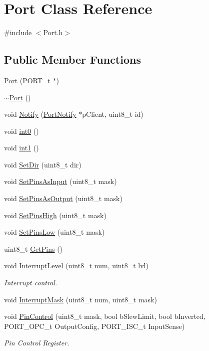 \hypertarget{class_port}{
\section{Port Class Reference}
\label{class_port}
}


{\ttfamily \#include $<$Port.h$>$}

\subsection*{Public Member Functions}
\begin{DoxyCompactItemize}
\item 
\hyperlink{class_port_a6f90240a1d5bb00b7cb0284134ba3dfc}{Port} (PORT\_\-t $\ast$)
\item 
\hyperlink{class_port_afe166c2a6b10ad34d47472a150366bc1}{$\sim$Port} ()
\item 
void \hyperlink{class_port_a8dd6215565362d65fd4ef159b7b8dc95}{Notify} (\hyperlink{class_port_notify}{PortNotify} $\ast$pClient, uint8\_\-t id)
\item 
void \hyperlink{class_port_ab9841b306c73a2b7a1a7a141da222808}{int0} ()
\item 
void \hyperlink{class_port_ac1ea39cc9b07779045dd218aa2364e25}{int1} ()
\item 
void \hyperlink{class_port_a3c3182388b13059550d19e828959ab37}{SetDir} (uint8\_\-t dir)
\item 
void \hyperlink{class_port_a8edf3efbf5258faa7221109f5cbd5a40}{SetPinsAsInput} (uint8\_\-t mask)
\item 
void \hyperlink{class_port_a15035cc63128ae28294c154527c9d2fe}{SetPinsAsOutput} (uint8\_\-t mask)
\item 
void \hyperlink{class_port_a4c7069d8f3c95c2edbbb5945041c687d}{SetPinsHigh} (uint8\_\-t mask)
\item 
void \hyperlink{class_port_aa0e48b7851cc1352c5e8ddc371351e21}{SetPinsLow} (uint8\_\-t mask)
\item 
uint8\_\-t \hyperlink{class_port_ab13ab1f58e8f17fec681e38872ac56d9}{GetPins} ()
\item 
void \hyperlink{class_port_ae43736d7fff93b93d1d1dac27df64591}{InterruptLevel} (uint8\_\-t num, uint8\_\-t lvl)
\begin{DoxyCompactList}\small\item\em Interrupt control. \item\end{DoxyCompactList}\item 
void \hyperlink{class_port_a638be122540b191c8cb84b61d6363d28}{InterruptMask} (uint8\_\-t num, uint8\_\-t mask)
\item 
void \hyperlink{class_port_ab2f2ecab7c1402a03c87d866a8cd5380}{PinControl} (uint8\_\-t mask, bool bSlewLimit, bool bInverted, PORT\_\-OPC\_\-t OutputConfig, PORT\_\-ISC\_\-t InputSense)
\begin{DoxyCompactList}\small\item\em Pin Control Register. \item\end{DoxyCompactList}\end{DoxyCompactItemize}
